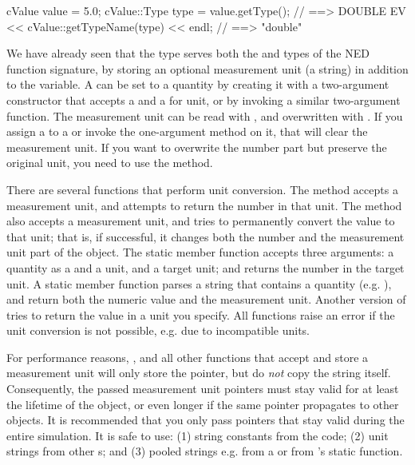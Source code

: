 \begin{cpp}
cValue value = 5.0;
cValue::Type type = value.getType(); // ==> DOUBLE
EV << cValue::getTypeName(type) << endl; // ==> "double"
\end{cpp}

We have already seen that the  type serves both the
 and  types of the NED function
signature, by storing an optional measurement unit (a string)
in addition to the  variable. A  can be set
to a quantity by creating it with a two-argument constructor that accepts
a  and a  for unit, or by invoking a similar
two-argument  function. The measurement unit can be read with
, and overwritten with . If you assign a
 to a  or invoke the one-argument
 method on it, that will clear the measurement unit. If you
want to overwrite the number part but preserve the original unit, you need
to use the  method.

There are several functions that perform unit conversion. The
 method accepts a measurement unit, and attempts
to return the number in that unit. The  method also
accepts a measurement unit, and tries to permanently convert the value to
that unit; that is, if successful, it changes both the number and the
measurement unit part of the object. The  static
 member function accepts three arguments: a quantity as a
 and a unit, and a target unit; and returns the number in the
target unit. A  static member function parses
a string that contains a quantity (e.g. ), and return
both the numeric value and the measurement unit. Another version of
 tries to return the value in a unit you specify.
All functions raise an error if the unit conversion is not possible, e.g.
due to incompatible units.

For performance reasons, ,  and all other
functions that accept and store a measurement unit will only store the
 pointer, but do \textit{not} copy the string itself.
Consequently, the passed measurement unit pointers must stay valid for at
least the lifetime of the  object, or even longer if the
same pointer propagates to other  objects. It is
recommended that you only pass pointers that stay valid during the entire
simulation. It is safe to use: (1) string constants from the code; (2) unit
strings from other s; and (3) pooled strings e.g. from a
 or from 's static 
function.

